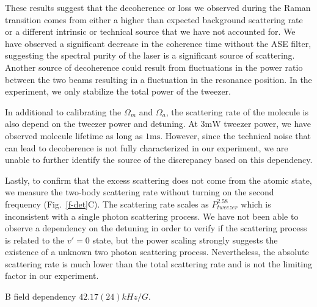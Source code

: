 \documentclass[aps,prl,twocolumn,superscriptaddress]{revtex4-1}
\newcommand{\todo}[1]{}
\begin{document}
\todo{change scattering to decoherence? since the fluctuation of light shift
  does not lead to scattering but only decherence.}
These results suggest that the decoherence or loss we observed during the Raman transition
comes from either a higher than expected background scattering rate
or a different intrinsic or technical source that we have not accounted for.
We have observed a significant decrease in the coherence time without the ASE filter,
suggesting the spectral purity of the laser is a significant source of scattering.
Another source of decoherence could result from fluctuations in the power ratio
between the two beams resulting in a fluctuation in the resonance position.
In the experiment, we only stabilize the total power of the tweezer.

In additional to calibrating the $\Omega_m$ and $\Omega_a$,
the scattering rate of the molecule is also depend on the tweezer power and detuning.
At $3\mathrm{mW}$ tweezer power, we have observed molecule lifetime as long as $1\mathrm{ms}$.
However, since the technical noise that can lead to decoherence
is not fully characterized in our experiment,
we are unable to further identify the source of the discrepancy based on this dependency.

Lastly, to confirm that the excess scattering does not come from the atomic state,
we measure the two-body scattering rate
without turning on the second frequency (Fig.~\ref{f-det}C).
The scattering rate scales as $P_{tweezer}^{2.58}$ which is inconsistent
with a single photon scattering process.
We have not been able to observe a dependency on the detuning in order to verify
if the scattering process is related to the $v'=0$ state,
but the power scaling strongly suggests the existence of a unknown two photon scattering process.
Nevertheless, the absolute scattering rate is much lower than the total scattering rate
and is not the limiting factor in our experiment.

B field dependency $42.17(24) kHz/G$.
\end{document}
